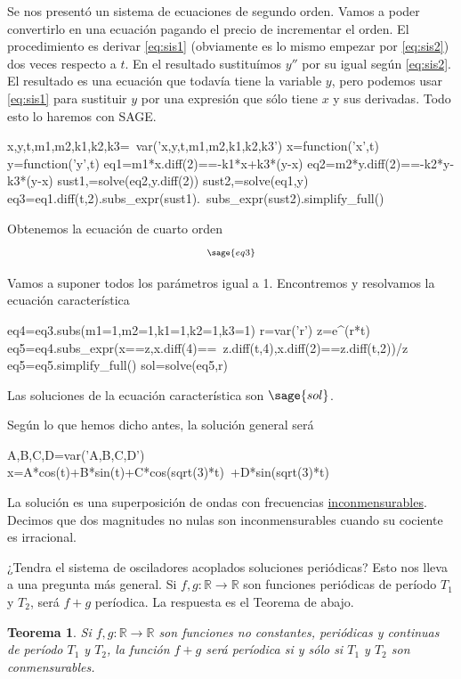 \documentclass{article}
\newcommand{\rr}{\mathbb{R}}
\newtheorem{teorema}{Teorema}[section]
\begin{document}
Se nos presentó un sistema de ecuaciones de segundo orden. Vamos a poder convertirlo en una ecuación pagando el precio de incrementar el orden. El procedimiento es derivar \eqref{eq:sis1} (obviamente es lo mismo empezar por \eqref{eq:sis2}) dos veces respecto a $t$. En el resultado sustituímos $y''$ por su igual según \eqref{eq:sis2}. El resultado es una ecuación que todavía tiene la variable $y$, pero podemos usar \eqref{eq:sis1} para sustituir $y$ por una expresión que sólo tiene $x$ y sus derivadas. Todo esto lo haremos con SAGE.


\begin{sageblock}
  x,y,t,m1,m2,k1,k2,k3=\
  var('x,y,t,m1,m2,k1,k2,k3')
  x=function('x',t)
  y=function('y',t)
  eq1=m1*x.diff(2)==-k1*x+k3*(y-x)
  eq2=m2*y.diff(2)==-k2*y-k3*(y-x)
  sust1,=solve(eq2,y.diff(2))
  sust2,=solve(eq1,y)
  eq3=eq1.diff(t,2).subs_expr(sust1).\
  subs_expr(sust2).simplify_full()
\end{sageblock}
Obtenemos la ecuación de cuarto orden
\[{\scriptstyle \sage{eq3}}\]


 Vamos a suponer todos los parámetros igual a 1. Encontremos y resolvamos la ecuación característica
\begin{sageblock}
  eq4=eq3.subs(m1=1,m2=1,k1=1,k2=1,k3=1)
  r=var('r')
  z=e^(r*t)
  eq5=eq4.subs_expr(x==z,x.diff(4)==\
  z.diff(t,4),x.diff(2)==z.diff(t,2))/z
  eq5=eq5.simplify_full()
  sol=solve(eq5,r)
\end{sageblock}
Las soluciones de la ecuación característica son $\sage{sol}$.



Según lo que hemos dicho antes, la solución general será

\begin{sageblock}
  A,B,C,D=var('A,B,C,D')
  x=A*cos(t)+B*sin(t)+C*cos(sqrt(3)*t)\
  +D*sin(sqrt(3)*t)
\end{sageblock}
La solución es una superposición de ondas con frecuencias \href{http://es.wikipedia.org/wiki/Conmensurabilidad_(matemática)}{inconmensurables}. Decimos que dos magnitudes no nulas son inconmensurables cuando su cociente es irracional. 




¿Tendra el sistema de osciladores acoplados soluciones periódicas?  Esto nos lleva a una pregunta más general. Si $f,g:\rr\to\rr$ son funciones periódicas de período $T_1$y $T_2$, será $f+g$ períodica. La respuesta es el Teorema de abajo. 
  
\begin{teorema}  Si $f,g:\rr\to\rr$ son funciones no constantes, periódicas y continuas de período $T_1$ y $T_2$, la función $f+g$ será períodica si y sólo si $T_1$ y $T_2$ son conmensurables.
\end{teorema}
\end{document}
